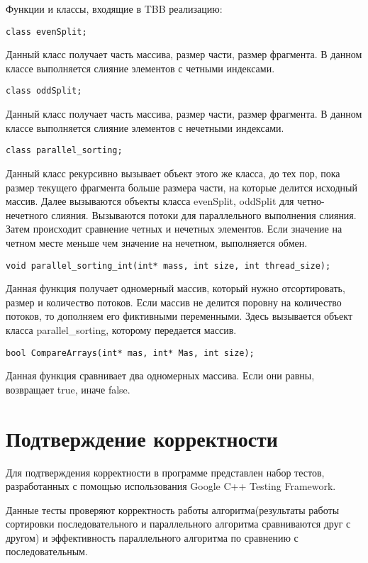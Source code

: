 \documentclass{report}
\begin{document}
\par Функции и классы, входящие в TBB реализацию:

\begin{lstlisting}
class evenSplit;
\end{lstlisting}
\par Данный класс получает часть массива, размер части, размер фрагмента. В данном классе выполняется слияние элементов с четными индексами.

\begin{lstlisting}
class oddSplit;
\end{lstlisting}
\par Данный класс получает часть массива, размер части, размер фрагмента. В данном классе выполняется слияние элементов с нечетными индексами.

\begin{lstlisting}
class parallel_sorting;
\end{lstlisting}
\par Данный класс рекурсивно вызывает объект этого же класса, до тех пор, пока размер текущего фрагмента больше размера части, на которые делится исходный массив. Далее вызываются объекты класса evenSplit, oddSplit для четно-нечетного слияния. Вызываются потоки для параллельного выполнения слияния. Затем происходит сравнение четных и нечетных элементов. Если значение на четном месте меньше чем значение на нечетном, выполняется обмен.

\begin{lstlisting}
void parallel_sorting_int(int* mass, int size, int thread_size);
\end{lstlisting}
\par Данная функция получает одномерный массив, который нужно отсортировать, размер и количество потоков. Если массив не делится поровну на количество потоков, то дополняем его фиктивными переменными. Здесь вызывается объект класса parallel\_sorting, которому передается массив.

\begin{lstlisting}
bool CompareArrays(int* mas, int* Mas, int size);
\end{lstlisting}
\par Данная функция сравнивает два одномерных массива. Если они равны, возвращает true, иначе false.

\newpage

\section*{Подтверждение корректности}
Для подтверждения корректности в программе представлен набор тестов, разработанных с помощью использования Google C++ Testing Framework.
\par Данные тесты проверяют корректность работы алгоритма(результаты работы сортировки последовательного и параллельного алгоритма сравниваются друг с другом) и эффективность параллельного алгоритма по сравнению с последовательным.
\end{document}

